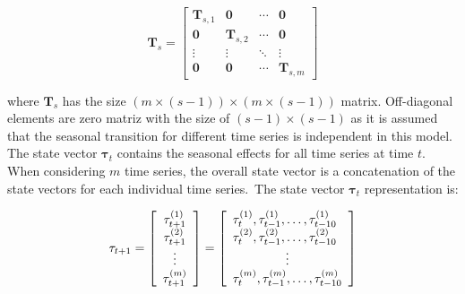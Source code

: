     \begin{equation}
        \mathbf{T}_s=
            \left[
                \begin{array}{cccc}
                    \mathbf{T}_{s, 1} & \mathbf{0}        & \cdots & \mathbf{0} \\
                    \mathbf{0}        & \mathbf{T}_{s, 2} & \cdots & \mathbf{0} \\
                    \vdots            & \vdots            & \ddots & \vdots     \\
                    \mathbf{0}        & \mathbf{0}        & \cdots & \mathbf{T}_{s, m}
                \end{array}
            \right]
        \label{eq:seasonal_transition_mv}
    \end{equation}

    where $\mathbf{T}_{s}$ has the size $(m \times (s-1)) \times (m \times (s-1))$ matrix.
    Off-diagonal elements are zero matriz with the size of $(s-1) \times (s-1)$ as it is assumed that the seasonal transition
    for different time series is independent in this model.
    The state vector $\bm{\tau}_t$ contains the seasonal effects for all time series at time $t$.
    When considering $m$ time series, the overall state vector is a concatenation of the state vectors for each
    individual time series.\ The state vector $\bm{\tau}_t$ representation is:

    \begin{equation}
        \tau_{t+1}=
            \left[
                \begin{array}{c}
                    \tau_{t+1}^{(1)} \\
                    \tau_{t+1}^{(2)} \\
                    \hfill \vdots \hfill \\
                    \tau_{t+1}^{(m)}
                \end{array}\right]
            =\left[
                \begin{array}{l}
                    \tau_t^{(1)}, \tau_{t-1}^{(1)}, \ldots, \tau_{t-10}^{(1)} \\
                    \tau_t^{(2)}, \tau_{t-1}^{(2)}, \ldots, \tau_{t-10}^{(2)} \\
                    \hfill \vdots \hfill \\
                    \tau_t^{(m)}, \tau_{t-1}^{(m)}, \ldots, \tau_{t-10}^{(m)}
                \end{array}
            \right]
        \label{eq:seasonal_state}
    \end{equation}

